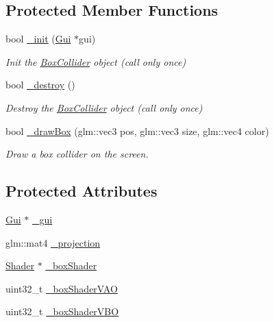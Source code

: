 \subsection*{Protected Member Functions}
\begin{DoxyCompactItemize}
\item 
bool \hyperlink{class_box_collider_a5782997a36f86f46a83d4f528c7ae391}{\+\_\+init} (\hyperlink{class_gui}{Gui} $\ast$gui)
\begin{DoxyCompactList}\small\item\em Init the \hyperlink{class_box_collider}{Box\+Collider} object (call only once) \end{DoxyCompactList}\item 
bool \hyperlink{class_box_collider_a447744df9a4567cab18eb6aabc8fd1c6}{\+\_\+destroy} ()
\begin{DoxyCompactList}\small\item\em Destroy the \hyperlink{class_box_collider}{Box\+Collider} object (call only once) \end{DoxyCompactList}\item 
bool \hyperlink{class_box_collider_af71d692699a39ea2bc5ee61384d533e9}{\+\_\+draw\+Box} (glm\+::vec3 pos, glm\+::vec3 size, glm\+::vec4 color)
\begin{DoxyCompactList}\small\item\em Draw a box collider on the screen. \end{DoxyCompactList}\end{DoxyCompactItemize}
\subsection*{Protected Attributes}
\begin{DoxyCompactItemize}
\item 
\hyperlink{class_gui}{Gui} $\ast$ \hyperlink{class_box_collider_a79878a3379cc1710aec75057373dc3d1}{\+\_\+gui}
\item 
glm\+::mat4 \hyperlink{class_box_collider_a1eb52f9eec4a732c48b12c074ce23c29}{\+\_\+projection}
\item 
\hyperlink{class_shader}{Shader} $\ast$ \hyperlink{class_box_collider_ab8642b5f05444676fb3ef9bccda8ce34}{\+\_\+box\+Shader}
\item 
uint32\+\_\+t \hyperlink{class_box_collider_ab57de816c107545459f5b920688f9cc6}{\+\_\+box\+Shader\+V\+AO}
\item 
uint32\+\_\+t \hyperlink{class_box_collider_af2ac832bfc806b578a9b9be7d39c7946}{\+\_\+box\+Shader\+V\+BO}
\end{DoxyCompactItemize}
